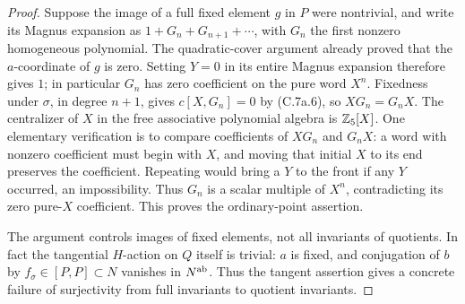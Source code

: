 \begin{proof}
Suppose the image of a full fixed element $g$ in $P$ were nontrivial,
and write its Magnus expansion as $1+G_n+G_{n+1}+\cdots$, with $G_n$
the first nonzero homogeneous polynomial. The quadratic-cover argument
already proved that the $a$-coordinate of $g$ is zero. Setting $Y=0$ in
its entire Magnus expansion therefore gives $1$; in particular $G_n$
has zero coefficient on the pure word $X^n$. Fixedness under $\sigma$,
in degree $n+1$, gives $c[X,G_n]=0$ by (C.7a.6), so $XG_n=G_nX$.
The centralizer of $X$ in the free associative polynomial algebra is
$\mathbb Z_5[X]$. One elementary verification is to compare coefficients of
$XG_n$ and $G_nX$: a word with nonzero coefficient must begin with $X$,
and moving that initial $X$ to its end preserves the coefficient.
Repeating would bring a $Y$ to the front if any $Y$ occurred, an
impossibility. Thus $G_n$ is a scalar multiple of $X^n$, contradicting
its zero pure-$X$ coefficient. This proves the ordinary-point assertion.

The argument controls images of fixed elements, not all invariants of
quotients. In fact the tangential $H$-action on $Q$ itself is trivial:
$a$ is fixed, and conjugation of $b$ by $f_\sigma\in[P,P]\subset N$
vanishes in $N^{\rm ab}$. Thus the tangent assertion gives a concrete
failure of surjectivity from full invariants to quotient invariants.
\end{proof}
